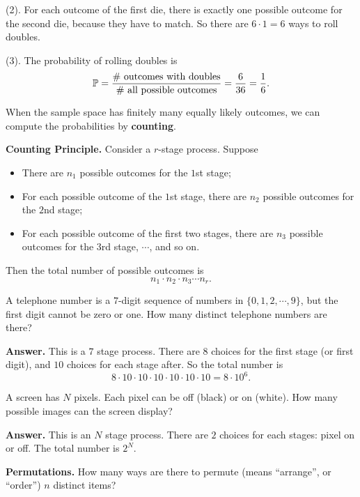   (2). For each outcome of the first die, there is exactly one possible outcome
  for the second die, because they have to match. So there are $6\cdot 1 = 6$
  ways to roll doubles.
  

  (3). The probability of rolling doubles is
  \[
    \mathbb{P} = \frac{\# ~\text{outcomes with doubles}}{\#~\text{all possible
        outcomes}} = \frac{6}{36} = \frac{1}{6}.
  \]

  \begin{remark}
    When the sample space has finitely many equally likely outcomes, we can
    compute the probabilities by \textbf{counting}.
  \end{remark}

  \textbf{Counting Principle.} Consider a $r$-stage process. Suppose
  \begin{itemize}
  \item There are $n_1$ possible outcomes for the $1$st stage;
  \item For each possible outcome of the $1$st stage, there are $n_2$ possible
    outcomes for the $2$nd stage;
  \item For each possible outcome of the first two stages, there are $n_3$
    possible outcomes for the $3$rd stage, $\cdots$, and so on.
  \end{itemize}
  Then the total number of possible outcomes is
  \[
    n_1\cdot n_2\cdot n_3\cdots n_r.
  \]

  \begin{example}
    A telephone number is a $7$-digit sequence of numbers in $\{0,1,2,\cdots,
    9\}$, but the first digit cannot be zero or one. How many distinct telephone
    numbers are there?
  \end{example}

  \textbf{Answer.} This is a $7$ stage process. There are $8$ choices for the
  first stage (or first digit), and $10$ choices for each stage after. So the
  total number is
  \[
    8\cdot 10\cdot 10\cdot 10\cdot 10\cdot 10\cdot 10 = 8\cdot 10^6.
  \]

  \begin{example}
    A screen has $N$ pixels. Each pixel can be off (black) or on (white). How
    many possible images can the screen display?
  \end{example}

  \textbf{Answer.} This is an $N$ stage process. There are $2$ choices for each
  stages: pixel on or off. The total number is $2^N$.

  \textbf{Permutations.} How many ways are there to permute (means ``arrange'',
  or ``order'') $n$ distinct items?

